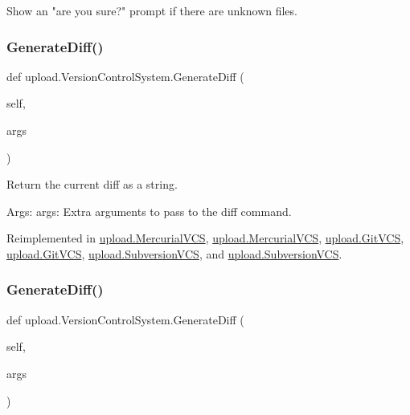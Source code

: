 \begin{DoxyVerb}Show an "are you sure?" prompt if there are unknown files.\end{DoxyVerb}
 \mbox{\label{classupload_1_1_version_control_system_aa5eb260c96e7016dab36b5fc136c9f49}} 
\subsubsection{\texorpdfstring{GenerateDiff()}{GenerateDiff()}\hspace{0.1cm}{\footnotesize\ttfamily [1/2]}}
{\footnotesize\ttfamily def upload.\+Version\+Control\+System.\+Generate\+Diff (\begin{DoxyParamCaption}\item[{}]{self,  }\item[{}]{args }\end{DoxyParamCaption})}

\begin{DoxyVerb}Return the current diff as a string.

Args:
  args: Extra arguments to pass to the diff command.
\end{DoxyVerb}
 

Reimplemented in \mbox{\hyperlink{classupload_1_1_mercurial_v_c_s_a6c05746012d8cd435c94ace1465671ef}{upload.\+Mercurial\+V\+CS}}, \mbox{\hyperlink{classupload_1_1_mercurial_v_c_s_a6c05746012d8cd435c94ace1465671ef}{upload.\+Mercurial\+V\+CS}}, \mbox{\hyperlink{classupload_1_1_git_v_c_s_a3ebfc01cebc9b585706ad3f4389a8833}{upload.\+Git\+V\+CS}}, \mbox{\hyperlink{classupload_1_1_git_v_c_s_a3ebfc01cebc9b585706ad3f4389a8833}{upload.\+Git\+V\+CS}}, \mbox{\hyperlink{classupload_1_1_subversion_v_c_s_a07c2d341f2c7df2772dd7f85e89b0212}{upload.\+Subversion\+V\+CS}}, and \mbox{\hyperlink{classupload_1_1_subversion_v_c_s_a07c2d341f2c7df2772dd7f85e89b0212}{upload.\+Subversion\+V\+CS}}.

\mbox{\label{classupload_1_1_version_control_system_aa5eb260c96e7016dab36b5fc136c9f49}} 
\subsubsection{\texorpdfstring{GenerateDiff()}{GenerateDiff()}\hspace{0.1cm}{\footnotesize\ttfamily [2/2]}}
{\footnotesize\ttfamily def upload.\+Version\+Control\+System.\+Generate\+Diff (\begin{DoxyParamCaption}\item[{}]{self,  }\item[{}]{args }\end{DoxyParamCaption})}

